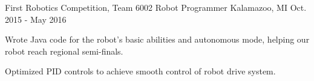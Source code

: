 \documentclass[12pt, a4paper]{awesome-cv}
\begin{document}
\begin{cventries}



  \cventry
    {First Robotics Competition, Team 6002}
    {Robot Programmer}
    {Kalamazoo, MI}
    {Oct. 2015 - May 2016}
    {
      \begin{cvitems}
        \item {Wrote Java code for the robot’s basic abilities and autonomous mode, helping our robot reach regional semi-finals.}
        \item {Optimized PID controls to achieve smooth control of robot drive system.}
      \end{cvitems}
    }


\end{cventries}
\end{document}
